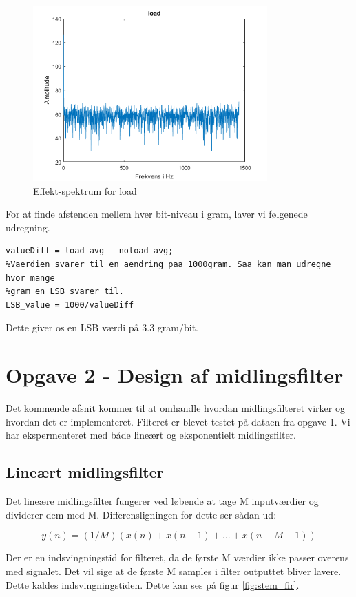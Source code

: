\documentclass[12pt]{article}
\begin{document}
\begin{figure}[H]
	\centering
	\includegraphics[width=90mm]{Img/load_effekt.png}
	\caption{Effekt-spektrum for load}
	\label{fig:effekt_load}
\end{figure}

For at finde afstenden mellem hver bit-niveau i gram, laver vi følgenede udregning.

\begin{lstlisting}[frame=single] 
valueDiff = load_avg - noload_avg;
%Vaerdien svarer til en aendring paa 1000gram. Saa kan man udregne hvor mange
%gram en LSB svarer til.
LSB_value = 1000/valueDiff
\end{lstlisting}

Dette giver os en LSB værdi på 3.3 gram/bit.

\section{Opgave 2 - Design af midlingsfilter}
Det kommende afsnit kommer til at omhandle hvordan midlingsfilteret virker og hvordan det er implementeret. Filteret er blevet testet på dataen fra opgave 1. Vi har ekspermenteret med både lineært og eksponentielt midlingsfilter. 

\subsection{Lineært midlingsfilter}
Det lineære midlingsfilter fungerer ved løbende at tage M inputværdier og dividerer dem med M. Differensligningen for dette ser sådan ud:

\[ y(n)= (1/M)(x(n)+x(n-1)+...+x(n-M+1))\]

Der er en indsvingningstid for filteret, da de første M værdier ikke passer overens med signalet. Det vil sige at de første M samples i filter outputtet bliver lavere. Dette kaldes indsvingningstiden. Dette kan ses på figur \ref{fig:stem_fir}.
\end{document}
